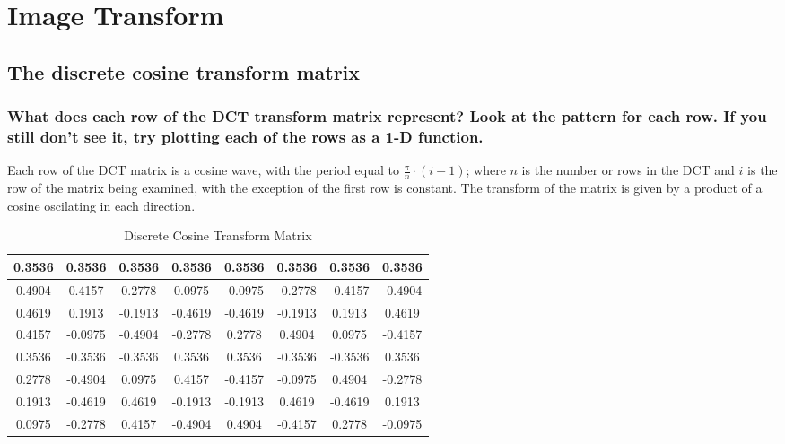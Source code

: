 \section{Image Transform}

\clearpage
\subsection{The discrete cosine transform matrix}

\subsubsection{What does each row of the DCT transform matrix represent? Look at the pattern for each row. If you still don't see it, try plotting each of the rows as a 1-D function.}
Each row of the DCT matrix is a cosine wave, with the period equal to $\frac{\pi}{n} \cdot (i-1)$; where $n$ is the number or rows in the DCT and $i$ is the row of the matrix being examined, with the exception of the first row is constant. The transform of the matrix is given by a product of a cosine oscilating in each direction.

\begin{table}[tbhc]
	\caption{Discrete Cosine Transform Matrix}
	\label{tbl:dctm}
	\begin{center}
		\begin{tabular}{ c | c | c | c | c | c | c | c}
0.3536	&	0.3536	&	0.3536	&	0.3536	&	0.3536	&	0.3536	&	0.3536	&	0.3536	\\
\hline
0.4904	&	0.4157	&	0.2778	&	0.0975	&	-0.0975	&	-0.2778	&	-0.4157	&	-0.4904	\\
\hline
0.4619	&	0.1913	&	-0.1913	&	-0.4619	&	-0.4619	&	-0.1913	&	0.1913	&	0.4619	\\
\hline
0.4157	&	-0.0975	&	-0.4904	&	-0.2778	&	0.2778	&	0.4904	&	0.0975	&	-0.4157	\\
\hline
0.3536	&	-0.3536	&	-0.3536	&	0.3536	&	0.3536	&	-0.3536	&	-0.3536	&	0.3536	\\
\hline
0.2778	&	-0.4904	&	0.0975	&	0.4157	&	-0.4157	&	-0.0975	&	0.4904	&	-0.2778	\\
\hline
0.1913	&	-0.4619	&	0.4619	&	-0.1913	&	-0.1913	&	0.4619	&	-0.4619	&	0.1913	\\
\hline
0.0975	&	-0.2778	&	0.4157	&	-0.4904	&	0.4904	&	-0.4157	&	0.2778	&	-0.0975	\\
		\end{tabular}
	\end{center}
\end{table}


